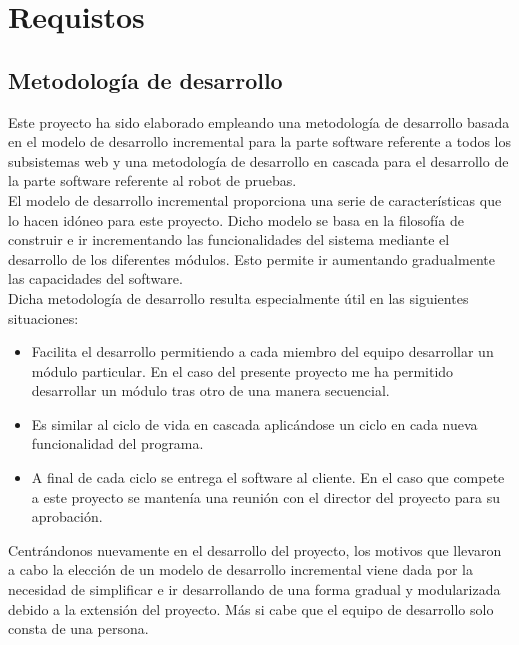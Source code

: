 \newpage

\chapter{ Requistos }
\label{chap:requisitos}


\section{Metodología de desarrollo}

Este proyecto ha sido elaborado empleando una metodología de desarrollo basada en
el modelo de desarrollo incremental para la parte software referente a todos los subsistemas web y una metodología de desarrollo en cascada para el desarrollo de la parte
software referente al robot de pruebas.\\

El modelo de desarrollo incremental proporciona una serie de características que lo hacen idóneo para este proyecto. Dicho modelo se basa en la filosofía de construir 
e ir incrementando las funcionalidades del sistema mediante el desarrollo de los diferentes módulos. Esto permite ir aumentando gradualmente las capacidades del software. \\

Dicha metodología de desarrollo resulta especialmente útil en las siguientes situaciones:\\

\begin{itemize}
 \item Facilita el desarrollo permitiendo a cada miembro del equipo desarrollar un módulo particular. En el caso del presente proyecto me ha permitido desarrollar un módulo tras otro de una manera secuencial.
 \item Es similar al ciclo de vida en cascada aplicándose un ciclo en cada nueva funcionalidad del programa.
 \item A final de cada ciclo se entrega el software al cliente. En el caso que compete a este proyecto se mantenía una reunión con el director del proyecto para su aprobación.
\end{itemize}

Centrándonos nuevamente en el desarrollo del proyecto, los motivos que llevaron a cabo la elección de un modelo de desarrollo incremental viene dada por la necesidad de simplificar e ir
desarrollando de una forma gradual y modularizada debido a la extensión del proyecto. Más si cabe que el equipo de desarrollo solo consta de una persona.\\

